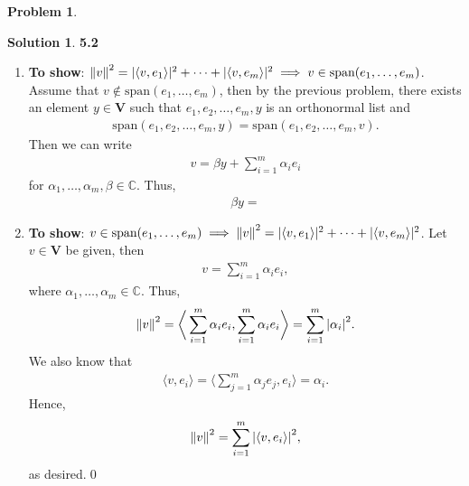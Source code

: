 \documentclass{article}
\theoremstyle{definition}
\newtheorem*{prob*}{Problem}
\newtheorem*{sln*}{Solution}
\newcommand{\V}{\mathbf{V}}
\newcommand{\xpan}{\text{span}}
\newcommand{\la}{\langle}
\newcommand{\ra}{\rangle}
\begin{document}
\begin{prob*}
\begin{enumerate}
		\begin{sln*}\textbf{5.2}
		\begin{enumerate}
			\item \textbf{To show}: $\norm{v}^2= \vert \la v, e_1 \ra \vert^2 + \dots + \vert \la v, e_m \ra \vert^2 \implies v\in \xpan(e_1,\dots,e_m)$. Assume that $v\notin \xpan(e_1,\dots,e_m)$, then by the previous problem, there exists an element $y\in \V$ such that $e_1,e_2,\dots,e_m,y$ is an orthonormal list and 
			\begin{align*}
			\xpan(e_1,e_2,\dots,e_m,y) = \xpan(e_1,e_2,\dots,e_m,v). 
			\end{align*}
			Then we can write
			\begin{align*}
			v = \beta y + \sum^m_{i=1}\alpha_i e_i 
			\end{align*}
			for $\alpha_1,\dots,\alpha_m, \beta \in \mathbb{C}$. Thus,
			\begin{align*}
			\beta y = 
			\end{align*}
			
			
			
			
			
			\item \textbf{To show}: $v\in \xpan(e_1,\dots,e_m) \implies \norm{v}^2= \vert \la v, e_1 \ra \vert^2 + \dots + \vert \la v, e_m \ra \vert^2$. Let $v\in \V$ be given, then
			\begin{align*}
			v = \sum^m_{i=1}\alpha_i e_i,
			\end{align*}
			where $\alpha_1,\dots,\alpha_m \in \mathbb{C}$. Thus,
			\begin{align*}
			\norm{v}^2 = \bigg\la \sum^m_{i=1}\alpha_i e_i, \sum^m_{i=1}\alpha_i e_i \bigg\ra = \sum^m_{i=1}\abs{\alpha_i}^2.
			\end{align*}
			We also know that
			\begin{align*}
			\la v, e_i \ra = \bigg\la \sum^m_{j=1}\alpha_j e_j , e_i\bigg\ra = \alpha_i.
			\end{align*}
			Hence, 
			\begin{align*}
			\norm{v}^2 = \sum^m_{i=1}\abs{\la v, e_i \ra}^2,
			\end{align*}
			as desired.\qed
			
			
			
		\end{enumerate}
		\end{sln*}
	\end{enumerate}
\end{prob*}
\end{document}
